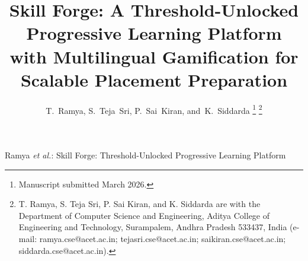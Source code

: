 \documentclass[journal]{IEEEtran}
\begin{document}
\title{Skill Forge: A Threshold-Unlocked Progressive Learning Platform with Multilingual Gamification for Scalable Placement Preparation}

\author{T.~Ramya,
        S.~Teja~Sri,
        P.~Sai~Kiran,
        and~K.~Siddarda
\thanks{Manuscript submitted March 2026.}
\thanks{T. Ramya, S. Teja Sri, P. Sai Kiran, and K. Siddarda are with the Department of Computer Science and Engineering, Aditya College of Engineering and Technology, Surampalem, Andhra Pradesh 533437, India (e-mail: ramya.cse@acet.ac.in; tejasri.cse@acet.ac.in; saikiran.cse@acet.ac.in; siddarda.cse@acet.ac.in).}}

{Ramya \MakeLowercase{\textit{et al.}}: Skill Forge: Threshold-Unlocked Progressive Learning Platform}

\maketitle
\end{document}
